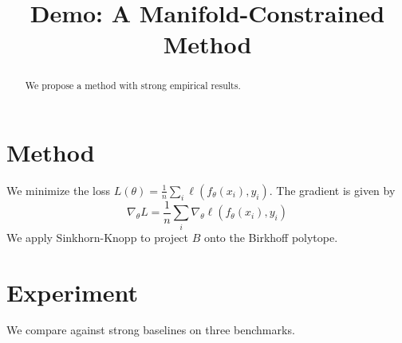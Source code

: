\title{Demo: A Manifold-Constrained Method}
\begin{abstract}
We propose a method with strong empirical results.
\end{abstract}
\section{Method}
We minimize the loss $L(\theta) = \frac{1}{n}\sum_i \ell(f_\theta(x_i), y_i)$.
The gradient is given by
\begin{equation}
\nabla_\theta L = \frac{1}{n}\sum_i \nabla_\theta \ell(f_\theta(x_i), y_i)
\end{equation}
We apply Sinkhorn-Knopp to project $B$ onto the Birkhoff polytope.
\section{Experiment}
We compare against strong baselines on three benchmarks.
